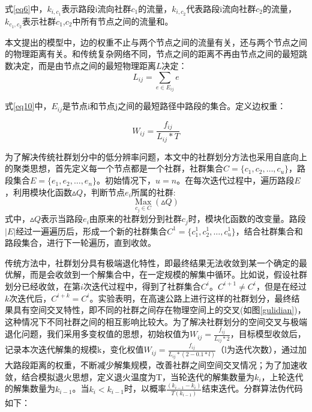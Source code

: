 				式\ref{eq6}中，${k_{i,{c_1}}}$表示路段i流向社群$c_1$的流量，$k_{i,{c_2}}$代表路段i流向社群$c_2$的流量，${{{k_{{c_1},{c_2}}}}}$表示社群$c_1$,$c_2$中所有节点之间的流量和。

				本文提出的模型中，边的权重不止与两个节点之间的流量有关，还与两个节点之间的物理距离有关。和传统复杂网络不同，节点之间的距离不再由节点之间的最短跳数决定，而是由节点之间的最短物理距离$L$决定：
				\begin{equation}
				L_{ij}=\sum\limits_{e \in E_{ij}} {e}
				\label{eq10}
				\end{equation}

				式\ref{eq10}中，$E_{ij}$是节点i和节点j之间的最短路径中路段的集合。定义边权重：


				\begin{equation}
				W_{ij}=\frac{f_{ij}}{L_{ij}*T}
				\label{eq11}
				\end{equation}

				为了解决传统社群划分中的低分辨率问题，本文中的社群划分方法也采用自底向上的聚类思想，首先定义每一个节点都是一个社群，社群集合$C=\{c_1,c_2,\dots,c_u\}$，路段集合$E=\{e_1,e_2,\dots,e_n\}$。初始情况下，$u=n$。在每次迭代过程中，遍历路段$E$，利用模块化函数$\vartriangle Q$，判断节点$e_i$所属的社群:
					$$\mathop{Max}\limits_{c_j\in C} (\vartriangle Q)$$
				式中，$\vartriangle Q$表示当路段$e_i$由原来的社群划分到社群$c_j$时，模块化函数的改变量。路段$|E|$经过一遍遍历后，形成一个新的社群集合$C^1=\{c_1^1,c_2^1,\dots,c_u^1\}$，结合社群集合和路段集合，进行下一轮遍历，直到收敛。

				传统方法中，社群划分具有极端退化特性，即最终结果无法收敛到某一个确定的最优解，而是会收敛到一个解集合中，在一定规模的解集中循环。比如说，假设社群划分已经收敛，在第$i$次迭代过程中，得到了社群集合$C^i$。$C^{i+1}\ne C^{i}$，但是在经过$k$次迭代后，$C^{i+k}=C^{i}$。实验表明，在高速公路上进行这样的社群划分，最终结果具有空间交叉特性，即不同的社群之间存在物理空间上的交叉(如图\ref{gulidian})，这种情况下不同社群之间的相互影响比较大。为了解决社群划分的空间交叉与极端退化问题，我们采用多变权值的思想，初始权值为$W_{ij}=\frac{f_{ij}}{L_{ij}*2}$，目标模型收敛后，记录本次迭代解集的规模k，变化权值$W_{ij}=\frac{f_{ij}}{L_{ij}*(2-0.1*l)}$（l为迭代次数），通过加大路段距离的权重，不断减少解集规模，改善社群之间空间交叉情况；为了加速收敛，结合模拟退火思想，定义退火温度为T，当轮迭代的解集数量为$k_i$，上轮迭代的解集数量为$k_{i-1}$。当$k_i<k_{i-1}$时，以概率$\frac {(k_{i-1}-k_i)}{T(k_{i-1})}$结束迭代。分群算法伪代码如下：

